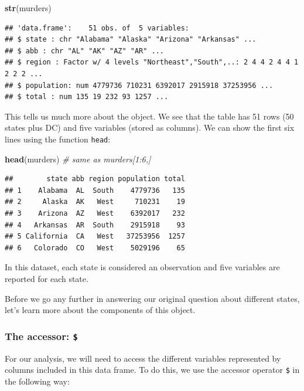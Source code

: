 \documentclass[
]{article}
\newenvironment{Shaded}{\begin{snugshade}}{\end{snugshade}}
\newcommand{\CommentTok}[1]{\textcolor[rgb]{0.56,0.35,0.01}{\textit{#1}}}
\newcommand{\FunctionTok}[1]{\textcolor[rgb]{0.13,0.29,0.53}{\textbf{#1}}}
\newcommand{\NormalTok}[1]{#1}
\begin{document}
\begin{Shaded}
\begin{Highlighting}[]
\FunctionTok{str}\NormalTok{(murders)}
\end{Highlighting}
\end{Shaded}

\begin{verbatim}
## 'data.frame':    51 obs. of  5 variables:
## $ state : chr "Alabama" "Alaska" "Arizona" "Arkansas" ...
## $ abb : chr "AL" "AK" "AZ" "AR" ...
## $ region : Factor w/ 4 levels "Northeast","South",..: 2 4 4 2 4 4 1 2 2 2 ...
## $ population: num 4779736 710231 6392017 2915918 37253956 ...
## $ total : num 135 19 232 93 1257 ...
\end{verbatim}

This tells us much more about the object. We see that the table has 51
rows (50 states plus DC) and five variables (stored as columns). We can
show the first six lines using the function \texttt{head}:

\begin{Shaded}
\begin{Highlighting}[]
\FunctionTok{head}\NormalTok{(murders)  }\CommentTok{\# same as murders[1:6,]}
\end{Highlighting}
\end{Shaded}

\begin{verbatim}
##        state abb region population total
## 1    Alabama  AL  South    4779736   135
## 2     Alaska  AK   West     710231    19
## 3    Arizona  AZ   West    6392017   232
## 4   Arkansas  AR  South    2915918    93
## 5 California  CA   West   37253956  1257
## 6   Colorado  CO   West    5029196    65
\end{verbatim}

In this dataset, each state is considered an observation and five
variables are reported for each state.

Before we go any further in answering our original question about
different states, let's learn more about the components of this object.

\subsubsection{\texorpdfstring{The accessor:
\texttt{\$}}{The accessor: \$}}\label{the-accessor}

For our analysis, we will need to access the different variables
represented by columns included in this data frame. To do this, we use
the accessor operator \texttt{\$} in the following way:
\end{document}
